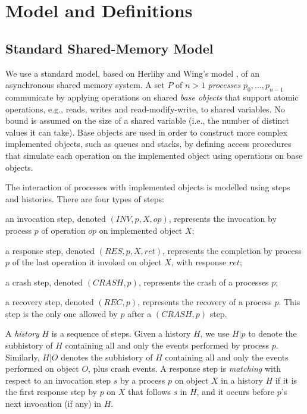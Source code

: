 
\section{Model and Definitions}
\label{section: Model}

\subsection{Standard Shared-Memory Model}

We use a standard model, based on Herlihy and Wing's model \cite{herlihyWingLinearizability}, of an asynchronous shared memory system. A set $P$ of $n > 1$ \textit{processes} $p_0, \ldots, p_{n-1}$ communicate by applying operations on shared \textit{base objects} that support atomic operations, e.g., reads, writes and read-modify-write, to shared variables. No bound is assumed on the size of a shared variable (i.e., the number of distinct values it can take).
Base objects are used in order to construct more complex implemented objects, such as queues and stacks, by defining access procedures that simulate each operation on the implemented object using operations on base objects.

The interaction of processes with implemented objects is modelled using steps and histories. There are four types of steps:
\begin{inparaenum}[(1)]
	\item an invocation step, denoted $(INV, p, X, op)$, represents the invocation by process $p$ of operation $op$ on implemented object $X$;
	\item a response step, denoted $(RES, p, X, ret)$, represents the completion by process $p$ of the last operation it invoked on object $X$, with response $ret$;
	\item a crash step, denoted $(CRASH, p)$, represents the crash of a processes $p$;
	\item a recovery step, denoted $(REC, p)$, represents the recovery of a process $p$. This step is the only one allowed by $p$ after a $(CRASH, p)$ step.
\end{inparaenum}

A \textit{history} $H$ is a sequence of steps. Given a history $H$, we use $H | p$ to denote the subhistory of $H$ containing all and only the events performed by process $p$. Similarly, $H | O$ denotes the subhistory of $H$ containing all and only the events performed on object $O$, plus crash events.
A response step is \textit{matching} with respect to an invocation step $s$ by a process $p$ on object $X$ in a history $H$ if it is the first response step by $p$ on $X$ that follows $s$ in $H$, and it occurs before $p$'s next invocation (if any) in $H$.

